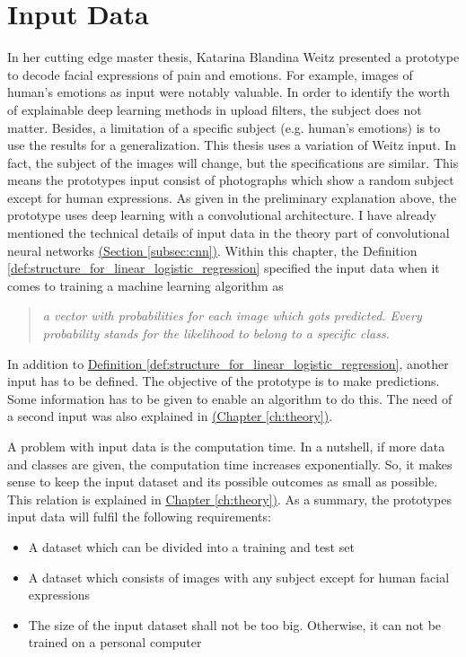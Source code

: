 \section{Input Data}

In her cutting edge master thesis, Katarina Blandina Weitz presented a prototype to decode facial expressions of pain and emotions. For example, images of human's emotions as input were notably valuable. In order to identify the worth of explainable deep learning methods in upload filters, the subject does not matter. Besides, a limitation of a specific subject (e.g. human's emotions) is to use the results for a generalization. This thesis uses a variation of Weitz input. In fact, the subject of the images will change, but the specifications are similar. This means the prototypes input consist of photographs which show a random subject except for human expressions. As given in the preliminary explanation above, the prototype uses deep learning with a convolutional architecture. I have already mentioned the technical details of input data in the theory part of convolutional neural networks \hyperref[subsec:cnn]{(Section \ref{subsec:cnn})}. Within this chapter, the Definition \ref{def:structure_for_linear_logistic_regression} specified the input data when it comes to training a machine learning algorithm as 

\begin{quote}
	\textit{a vector with probabilities for each image which gots predicted. Every probability stands for the likelihood to belong to a specific class.}
\end{quote}

In addition to \hyperref[def:structure_for_linear_logistic_regressionn]{Definition \ref{def:structure_for_linear_logistic_regression}}, another input has to be defined. The objective of the prototype is to make predictions. Some information has to be given to enable an algorithm to do this. The need of a second input was also explained in \hyperref[ch:theory]{(Chapter \ref{ch:theory})}.

A problem with input data is the computation time. In a nutshell, if more data and classes are given, the computation time increases exponentially. So, it makes sense to keep the input dataset and its possible outcomes as small as possible. This relation is explained in \hyperref[ch:theory]{Chapter \ref{ch:theory})}. As a summary, the prototypes input data will fulfil the following requirements:

\begin{itemize}
	\item A dataset which can be divided into a training and test set
	\item A dataset which consists of images with any subject except for human facial expressions
	\item The size of the input dataset shall not be too big. Otherwise, it can not be trained on a personal computer 
\end{itemize}

